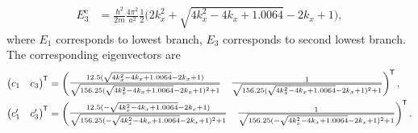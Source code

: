 \documentclass[12pt]{article}
\newcommand*{\tran}{^{\mkern-1.5mu\mathsf{T}}}
\begin{document}
\begin{enumerate}[(a)]
\begin{align}
	      	E_{3}^{\text{e}} & = \frac{\hbar^2}{2m} \frac{4\pi^2}{a^2}\frac{1}{2} \Big(2 k_x^2+\sqrt{4 k_x^2-4 k_x+1.0064}-2 k_x+1\Big),
	      \end{align}
	      where $E_1$ corresponds to lowest branch, $E_3$ corresponds to second lowest branch.
	      The
	      corresponding eigenvectors are
	      \begin{align}
	      	\begin{pmatrix}
	      	c_1                                                                                                          & c_3                                                                \\
	      	\end{pmatrix}\tran
	      	                                                                                                             & =
	      	\begin{pmatrix}
	      	\frac{12.5 (\sqrt{4 k_x^2-4 k_x+1.0064}-2 k_x+1)}{\sqrt{156.25 (\sqrt{4 k_x^2-4 k_x+1.0064}-2 k_x+1)^2+1}}   & \frac{1}{\sqrt{156.25 (\sqrt{4 k_x^2-4 k_x+1.0064}-2 k_x+1)^2+1}}  \\
	      	\end{pmatrix}\tran, \\
	      	\begin{pmatrix}
	      	c_1'                                                                                                         & c_3'                                                               \\
	      	\end{pmatrix}\tran
	      	                                                                                                             & =
	      	\begin{pmatrix}
	      	\frac{12.5 (-\sqrt{4 k_x^2-4 k_x+1.0064}-2 k_x+1)}{\sqrt{156.25 (-\sqrt{4 k_x^2-4 k_x+1.0064}-2 k_x+1)^2+1}} & \frac{1}{\sqrt{156.25 (-\sqrt{4 k_x^2-4 k_x+1.0064}-2 k_x+1)^2+1}} \\
	      	\end{pmatrix}\tran.
	      \end{align}


\end{enumerate}
\end{document}
